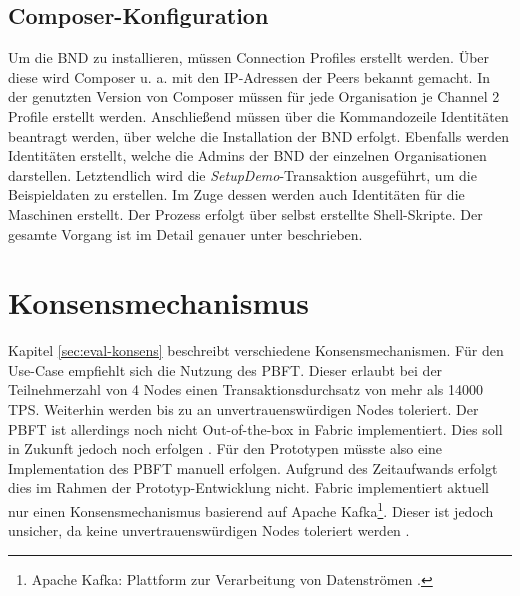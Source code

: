 \subsection{Composer-Konfiguration}
Um die \acs{BND} zu installieren, müssen Connection Profiles erstellt werden. Über diese wird Composer u. a. mit den IP-Adressen der Peers bekannt gemacht. In der genutzten Version von Composer müssen für jede Organisation je Channel 2 Profile erstellt werden. Anschließend müssen über die Kommandozeile Identitäten beantragt werden, über welche die Installation der \acs{BND} erfolgt. Ebenfalls werden Identitäten erstellt, welche die Admins der \acs{BND} der einzelnen Organisationen darstellen. Letztendlich wird die \textit{SetupDemo}-Transaktion ausgeführt, um die Beispieldaten zu erstellen. Im Zuge dessen werden auch Identitäten für die Maschinen erstellt. Der Prozess erfolgt über selbst erstellte Shell-Skripte. Der gesamte Vorgang ist im Detail genauer unter \cite{HyperledgerComposerTeamMultiOrgDeployment} beschrieben.

\section{Konsensmechanismus}
\label{sec:consensus-choose}
Kapitel \ref{sec:eval-konsens} beschreibt verschiedene Konsensmechanismen. Für den Use-Case empfiehlt sich die Nutzung des \acs{PBFT}. Dieser erlaubt bei der Teilnehmerzahl von 4 Nodes einen Transaktionsdurchsatz von mehr als 14000 \acs{TPS}. Weiterhin werden bis zu  an unvertrauenswürdigen Nodes toleriert. Der \acs{PBFT} ist allerdings noch nicht Out-of-the-box in Fabric implementiert. Dies soll in Zukunft jedoch noch erfolgen \cite{HyperledgerFabricTeamPluggableConsensusImplementations}. Für den Prototypen müsste also eine Implementation des \acs{PBFT} manuell erfolgen. Aufgrund des Zeitaufwands erfolgt dies im Rahmen der Prototyp-Entwicklung nicht. Fabric implementiert aktuell nur einen Konsensmechanismus basierend auf Apache Kafka\footnote{Apache Kafka: Plattform zur Verarbeitung von Datenströmen \cite{ApacheIntroductionApacheKafka}.}. Dieser ist jedoch unsicher, da keine unvertrauenswürdigen Nodes toleriert werden \cite{CachinBlockchainConsensusProtocols2017}.

